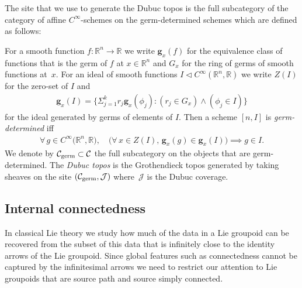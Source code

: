 \documentclass[pdftex]{sigma}
\numberwithin{equation}{section}
\begin{document}
The site that we use to generate the Dubuc topos is the full subcategory of the category of af\/f\/ine $C^{\infty}$-schemes on the germ-determined schemes which are def\/ined as follows:
\begin{Definition}\label{def:germ-determined-ideal}
For a smooth function $f\colon \mathbb{R}^{n}\rightarrow \mathbb{R}$ we write $\mathbf{g}_{x}(f)$ for the equivalence class of functions that is the germ of $f$ at $x\in\mathbb{R}^{n}$ and $G_{x}$ for the ring of germs of smooth functions at~$x$. For an ideal of smooth functions $I\triangleleft C^{\infty}(\mathbb{R}^{n},\mathbb{R})$ we write $Z(I)$ for the zero-set of $I$ and
\begin{gather*}\mathbf{g}_{x}(I)=\big\{\Sigma_{j=1}^{k}r_{j}\mathbf{g}_{x}(\phi_{j})\colon (r_{j}\in G_{x})\wedge(\phi_{j}\in I)\big\}\end{gather*}
for the ideal generated by germs of elements of $I$. Then a scheme $[n,I]$ is \emph{germ-determined} if\/f
\begin{gather*}\forall\, g\in C^{\infty}\big(\mathbb{R}^n,\mathbb{R}\big), \quad \big(\forall\, x\in Z(I), \, \mathbf{g}_{x}(g)\in \mathbf{g}_{x}(I)\big)\implies g\in I.\end{gather*}
We denote by $\mathcal{C}_{\rm germ}\subset \mathcal{C}$ the full subcategory on the objects that are germ-determined. The \emph{Dubuc topos} is the Grothendieck topos generated by taking sheaves on the site $(\mathcal{C}_{\rm germ},\mathcal{J})$ where~$\mathcal{J}$ is the Dubuc coverage.
\end{Definition}

\subsection{Internal connectedness}\label{sec:enriched-connectedness}

In classical Lie theory we study how much of the data in a Lie groupoid can be recovered from the subset of this data that is inf\/initely close to the identity arrows of the Lie groupoid. Since global features such as connectedness cannot be captured by the inf\/initesimal arrows we need to restrict our attention to Lie groupoids that are source path and source simply connected.
\end{document}
